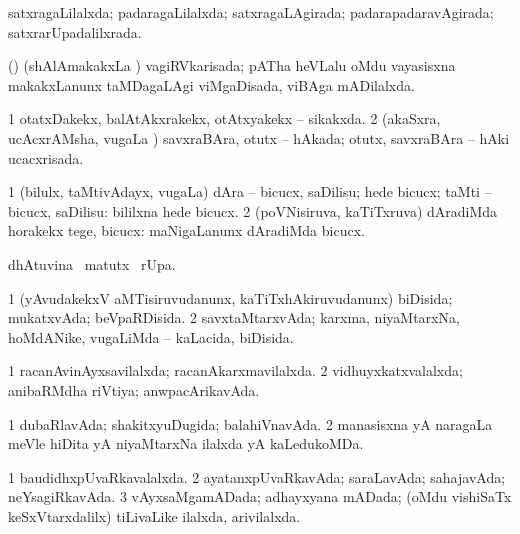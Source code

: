 \bentry
{} 
\gl{\gu}
\expl{}
\bmng
satxragaLilalxda; padaragaLilalxda; satxragaLAgirada; padarapadaravAgirada; satxrarUpadalilxrada. 
\emng
\eentry

\bentry
{} 
\gl{\gu}
\expl{}
\bmng
(\birx) (shAlAmakakxLa \vi) vagiRVkarisada; pATha heVLalu oMdu vayasisxna makakxLanunx taMDagaLAgi viMgaDisada, viBAga mADilalxda. 
\emng
\eentry

\bentry
{} 
\gl{\gu}
\expl{}
\bmng
\bnum
\num{1} otatxDakekx, balAtAkxrakekx, otAtxyakekx -- sikakxda. 
\num{2} (akaSxra, ucAcxrAMsha, \mo vugaLa \vi) savxraBAra, otutx -- hAkada; otutx, savxraBAra -- hAki ucacxrisada. 
\enum
\emng
\eentry

\bentry
{} 
\gl{\akirx}
\bmng
\bnum
\num{1} (bilulx, taMtivAdayx, \mo vugaLa) dAra -- bicucx, saDilisu; hede bicucx; taMti -- bicucx, saDilisu:  bililxna hede bicucx. 
\num{2} (poVNisiruva, kaTiTxruva) dAradiMda horakekx tege, bicucx:  maNigaLanunx dAradiMda bicucx. 
\enum
\emng
\eentry

\bentry
{} 
\gl{\kirx}
\expl{}
\bmng
{} dhAtuvina \BU\ matutx \BUkaq\ rUpa. 
\emng
\eentry

\bentry
{} 
\gl{\gu}
\expl{}
\bmng
\bnum
\num{1} (yAvudakekxV aMTisiruvudanunx, kaTiTxhAkiruvudanunx) biDisida; mukatxvAda; beVpaRDisida. 
\num{2} savxtaMtarxvAda; karxma, niyaMtarxNa, hoMdANike, \mo vugaLiMda -- kaLacida, biDisida. 
\enum
\emng
\eentry

\bentry
{} 
\gl{\gu}
\expl{}
\bmng
\bnum
\num{1} racanAvinAyxsavilalxda; racanAkarxmavilalxda. 
\num{2} vidhuyxkatxvalalxda; anibaRMdha riVtiya; anwpacArikavAda. 
\enum
\emng
\eentry

\bentry
{} 
\gl{\gu}
\expl{}
\bmng
\bnum
\num{1} dubaRlavAda; shakitxyuDugida; balahiVnavAda. 
\num{2} manasisxna yA naragaLa meVle hiDita yA niyaMtarxNa ilalxda yA kaLedukoMDa. 
\enum
\emng
\eentry

\bentry
{} 
\gl{\gu}
\expl{}
\bmng
\bnum
\num{1} baudidhxpUvaRkavalalxda. 
\num{2} ayatanxpUvaRkavAda; saraLavAda; sahajavAda; neYsagiRkavAda. 
\num{3} vAyxsaMgamADada; adhayxyana mADada; (oMdu vishiSaTx keSxVtarxdalilx) tiLivaLike ilalxda, arivilalxda. 
\enum
\emng
\eentry

